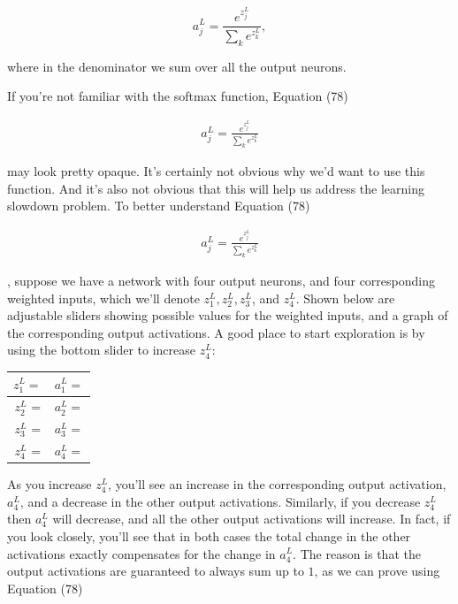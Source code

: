 \begin{equation}
a^L_j = \frac{e^{z^L_j}}{\sum_k e^{z^L_k}},
\tag{78}
\end{equation}

\noindent where in the denominator we sum over all the output neurons.


If you're not familiar with the softmax function, Equation (78)

\begin{align*}
a^L_j = \frac{e^{z^L_j}}{\sum_k e^{z^L_k}} \nonumber
\end{align*}

\noindent may look pretty opaque. It's certainly not obvious why we'd want to use this function. And it's also not obvious that this will help us address the learning slowdown problem. To better understand Equation (78)

\begin{align*}
a^L_j = \frac{e^{z^L_j}}{\sum_k e^{z^L_k}} \nonumber
\end{align*}

\noindent, suppose we have a network with four output neurons, and four corresponding weighted inputs, which we'll denote $z^L_1, z^L_2, z^L_3$, and $z^L_4$. Shown below are adjustable sliders showing possible values for the weighted inputs, and a graph of the corresponding output activations. A good place to start exploration is by using the bottom slider to increase $z^L_4$:



\begin{table}[htbp]
\centering
\small
\begin{tabular}{cc}
\toprule

$z^L_1 = $ & $a^L_1 = $ \\

\midrule

$z^L_2$ = & $a^L_2 = $ \\

$z^L_3$ = & $a^L_3 = $ \\

$z^L_4$ = & $a^L_4 = $ \\

\bottomrule
\end{tabular}
\end{table}


As you increase $z^L_4$, you'll see an increase in the corresponding output activation, $a^L_4$, and a decrease in the other output activations. Similarly, if you decrease $z^L_4$ then $a^L_4$ will decrease, and all the other output activations will increase. In fact, if you look closely, you'll see that in both cases the total change in the other activations exactly compensates for the change in $a^L_4$. The reason is that the output activations are guaranteed to always sum up to $1$, as we can prove using Equation (78)

